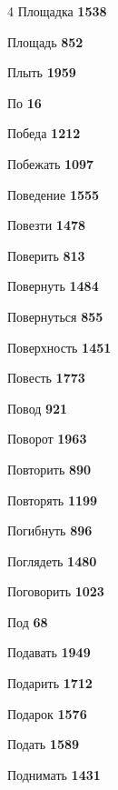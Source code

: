 \begin{multicols}{4}
\noindent Площадка \dotfill \textbf{\color{secondary} 1538}\par
\noindent Площадь \dotfill \textbf{\color{secondary} 852}\par
\noindent Плыть \dotfill \textbf{\color{secondary} 1959}\par
\noindent По \dotfill \textbf{\color{secondary} 16}\par
\noindent Победа \dotfill \textbf{\color{secondary} 1212}\par
\noindent Побежать \dotfill \textbf{\color{secondary} 1097}\par
\noindent Поведение \dotfill \textbf{\color{secondary} 1555}\par
\noindent Повезти \dotfill \textbf{\color{secondary} 1478}\par
\noindent Поверить \dotfill \textbf{\color{secondary} 813}\par
\noindent Повернуть \dotfill \textbf{\color{secondary} 1484}\par
\noindent Повернуться \dotfill \textbf{\color{secondary} 855}\par
\noindent Поверхность \dotfill \textbf{\color{secondary} 1451}\par
\noindent Повесть \dotfill \textbf{\color{secondary} 1773}\par
\noindent Повод \dotfill \textbf{\color{secondary} 921}\par
\noindent Поворот \dotfill \textbf{\color{secondary} 1963}\par
\noindent Повторить \dotfill \textbf{\color{secondary} 890}\par
\noindent Повторять \dotfill \textbf{\color{secondary} 1199}\par
\noindent Погибнуть \dotfill \textbf{\color{secondary} 896}\par
\noindent Поглядеть \dotfill \textbf{\color{secondary} 1480}\par
\noindent Поговорить \dotfill \textbf{\color{secondary} 1023}\par
\noindent Под \dotfill \textbf{\color{secondary} 68}\par
\noindent Подавать \dotfill \textbf{\color{secondary} 1949}\par
\noindent Подарить \dotfill \textbf{\color{secondary} 1712}\par
\noindent Подарок \dotfill \textbf{\color{secondary} 1576}\par
\noindent Подать \dotfill \textbf{\color{secondary} 1589}\par
\noindent Поднимать \dotfill \textbf{\color{secondary} 1431}\par

\end{multicols}
